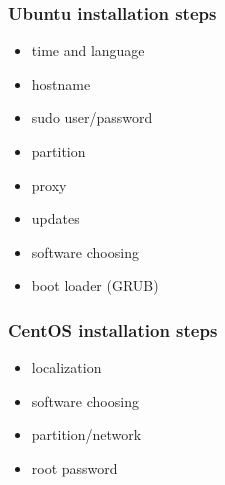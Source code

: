 \begin{frame}[fragile]
\frametitle{Ubuntu installation steps}
    \begin{itemize}       
        \item time and language
        \item hostname
        \item sudo user/password
        \item partition
        \item proxy
        \item updates
        \item software choosing
        \item boot loader (GRUB)
    \end{itemize}
\end{frame}

\begin{frame}[fragile]
\frametitle{CentOS installation steps}
    \begin{itemize}       
        \item localization
        \item software choosing
        \item partition/network
        \item root password
    \end{itemize}
\end{frame}
